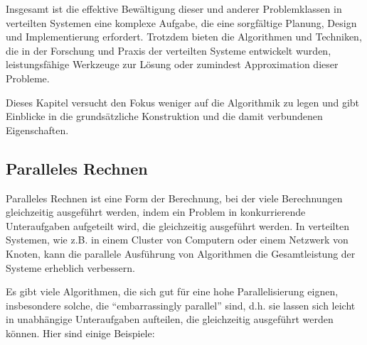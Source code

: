 Insgesamt ist die effektive Bewältigung dieser und anderer Problemklassen in verteilten Systemen eine komplexe Aufgabe, die eine sorgfältige Planung, Design und Implementierung erfordert. Trotzdem bieten die Algorithmen und Techniken, die in der Forschung und Praxis der verteilten Systeme entwickelt wurden, leistungsfähige Werkzeuge zur Lösung oder zumindest Approximation dieser Probleme.

Dieses Kapitel versucht den Fokus weniger auf die Algorithmik zu legen und gibt Einblicke in die grundsätzliche Konstruktion und die damit verbundenen Eigenschaften.

\subsection{Paralleles Rechnen}

Paralleles Rechnen ist eine Form der Berechnung, bei der viele Berechnungen gleichzeitig ausgeführt werden, indem ein Problem in konkurrierende Unteraufgaben aufgeteilt wird, die gleichzeitig ausgeführt werden. In verteilten Systemen, wie z.B. in einem Cluster von Computern oder einem Netzwerk von Knoten, kann die parallele Ausführung von Algorithmen die Gesamtleistung der Systeme erheblich verbessern.


Es gibt viele Algorithmen, die sich gut für eine hohe Parallelisierung eignen, insbesondere solche, die \enquote{embarrassingly parallel} sind, d.h. sie lassen sich leicht in unabhängige Unteraufgaben aufteilen, die gleichzeitig ausgeführt werden können. Hier sind einige Beispiele:

